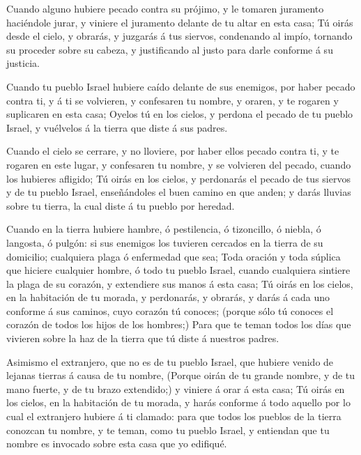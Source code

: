  Cuando alguno hubiere pecado contra su prójimo, y le
tomaren juramento haciéndole jurar, y viniere el juramento delante de tu
altar en esta casa;  Tú oirás desde el cielo, y obrarás, y
juzgarás á tus siervos, condenando al impío, tornando su proceder sobre
su cabeza, y justificando al justo para darle conforme á su justicia.

 Cuando tu pueblo Israel hubiere caído delante de sus
enemigos, por haber pecado contra ti, y á ti se volvieren, y confesaren
tu nombre, y oraren, y te rogaren y suplicaren en esta casa;
 Oyelos tú en los cielos, y perdona el pecado de tu pueblo
Israel, y vuélvelos á la tierra que diste á sus padres.

 Cuando el cielo se cerrare, y no lloviere, por haber ellos
pecado contra ti, y te rogaren en este lugar, y confesaren tu nombre, y
se volvieren del pecado, cuando los hubieres afligido;  Tú
oirás en los cielos, y perdonarás el pecado de tus siervos y de tu
pueblo Israel, enseñándoles el buen camino en que anden; y darás lluvias
sobre tu tierra, la cual diste á tu pueblo por heredad.

 Cuando en la tierra hubiere hambre, ó pestilencia, ó
tizoncillo, ó niebla, ó langosta, ó pulgón: si sus enemigos los tuvieren
cercados en la tierra de su domicilio; cualquiera plaga ó enfermedad que
sea;  Toda oración y toda súplica que hiciere cualquier
hombre, ó todo tu pueblo Israel, cuando cualquiera sintiere la plaga de
su corazón, y extendiere sus manos á esta casa;  Tú oirás
en los cielos, en la habitación de tu morada, y perdonarás, y obrarás, y
darás á cada uno conforme á sus caminos, cuyo corazón tú conoces;
(porque sólo tú conoces el corazón de todos los hijos de los hombres;)
 Para que te teman todos los días que vivieren sobre la haz
de la tierra que tú diste á nuestros padres.

 Asimismo el extranjero, que no es de tu pueblo Israel, que
hubiere venido de lejanas tierras á causa de tu nombre, 
(Porque oirán de tu grande nombre, y de tu mano fuerte, y de tu brazo
extendido;) y viniere á orar á esta casa;  Tú oirás en los
cielos, en la habitación de tu morada, y harás conforme á todo aquello
por lo cual el extranjero hubiere á ti clamado: para que todos los
pueblos de la tierra conozcan tu nombre, y te teman, como tu pueblo
Israel, y entiendan que tu nombre es invocado sobre esta casa que yo
edifiqué.

